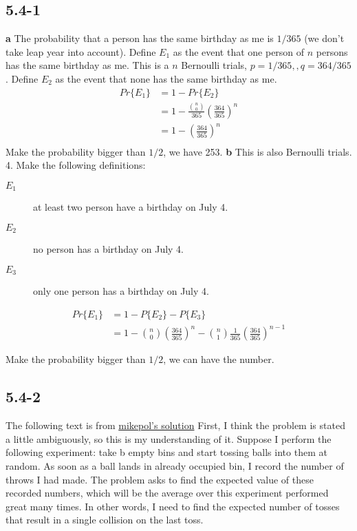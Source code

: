 \documentclass{book}
\begin{document}
\begin{CJK}{UTF8}{gkai}
\subsection*{5.4-1}
\textbf{a} The probability that a person has the same birthday as me is $1/365$ 
(we don't take leap year into account). Define $E_1$ as the event that one 
person of $n$ persons has the same birthday as me. This is a $n$ Bernoulli 
trials, $p=1/365,, q=364/365$. Define $E_2$ as the event that none has the same 
birthday as me.
\begin{align*}
Pr\{E_1\} & = 1 - Pr\{E_2\} \\
& = 1 - \frac{\binom{n}{0}}{365} (\frac{364}{365})^n \\
& = 1 - (\frac{364}{365})^n\\
\end{align*}
Make the probability bigger than $1/2$, we have 253.
\textbf{b} This is also Bernoulli trials.  4. Make the following definitions:
\begin{description}
\item[$E_1$] at least two person have a birthday on July 4.
\item[$E_2$] no person has a birthday on July 4.
\item[$E_3$] only one person has a birthday on July 4.
\end{description}
\begin{align*}
Pr\{E_1\} & = 1 - P\{E_2\} - P\{E_3\} \\
& = 1 - \binom{n}{0}(\frac{364}{365})^n - 
\binom{n}{1}\frac{1}{365}(\frac{364}{365})^{n-1}
\end{align*}

Make the probability bigger than $1/2$, we can have the number.

\subsection*{5.4-2}
The following text is from 
\href{http://www.physicsforums.com/showthread.php?t=248541}{mikepol's solution}
First, I think the problem is stated a little ambiguously, so this is my 
understanding of it. Suppose I perform the following experiment: take b empty 
bins and start tossing balls into them at random. As soon as a ball lands in 
already occupied bin, I record the number of throws I had made. The problem asks 
to find the expected value of these recorded numbers, which will be the average 
over this experiment performed great many times. In other words, I need to find 
the expected number of tosses that result in a single collision on the last 
toss.


\end{CJK}
\end{document}
